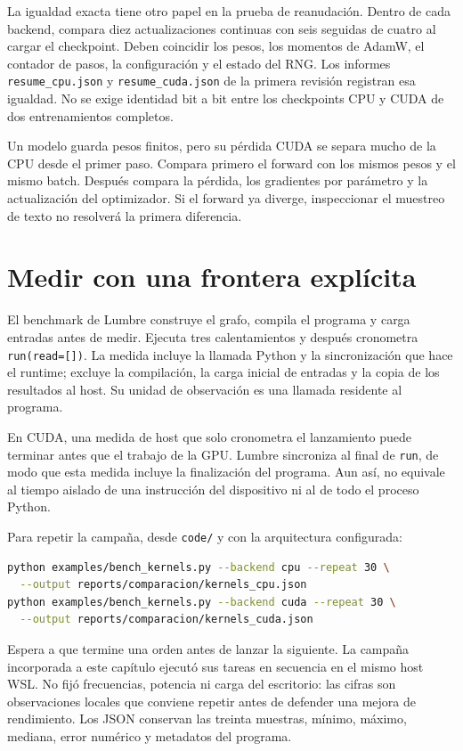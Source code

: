 \documentclass[12pt,a4paper,oneside]{report}
\begin{document}
La igualdad exacta tiene otro papel en la prueba de reanudación. Dentro de cada backend, compara diez actualizaciones continuas con seis seguidas de cuatro al cargar el checkpoint. Deben coincidir los pesos, los momentos de AdamW, el contador de pasos, la configuración y el estado del RNG. Los informes \texttt{resume\_cpu.json} y \texttt{resume\_cuda.json} de la primera revisión registran esa igualdad. No se exige identidad bit a bit entre los checkpoints CPU y CUDA de dos entrenamientos completos.

\begin{practica}
Un modelo guarda pesos finitos, pero su pérdida CUDA se separa mucho de la CPU desde el primer paso. Compara primero el forward con los mismos pesos y el mismo batch. Después compara la pérdida, los gradientes por parámetro y la actualización del optimizador. Si el forward ya diverge, inspeccionar el muestreo de texto no resolverá la primera diferencia.

\end{practica}
\section{Medir con una frontera explícita}
El benchmark de Lumbre construye el grafo, compila el programa y carga entradas antes de medir. Ejecuta tres calentamientos y después cronometra \texttt{run(read=[])}. La medida incluye la llamada Python y la sincronización que hace el runtime; excluye la compilación, la carga inicial de entradas y la copia de los resultados al host. Su unidad de observación es una llamada residente al programa.

En CUDA, una medida de host que solo cronometra el lanzamiento puede terminar antes que el trabajo de la GPU. Lumbre sincroniza al final de \texttt{run}, de modo que esta medida incluye la finalización del programa. Aun así, no equivale al tiempo aislado de una instrucción del dispositivo ni al de todo el proceso Python.

Para repetir la campaña, desde \texttt{code/} y con la arquitectura configurada:

\begin{lstlisting}[language=bash]
python examples/bench_kernels.py --backend cpu --repeat 30 \
  --output reports/comparacion/kernels_cpu.json
python examples/bench_kernels.py --backend cuda --repeat 30 \
  --output reports/comparacion/kernels_cuda.json
\end{lstlisting}
Espera a que termine una orden antes de lanzar la siguiente. La campaña incorporada a este capítulo ejecutó sus tareas en secuencia en el mismo host WSL. No fijó frecuencias, potencia ni carga del escritorio: las cifras son observaciones locales que conviene repetir antes de defender una mejora de rendimiento. Los JSON conservan las treinta muestras, mínimo, máximo, mediana, error numérico y metadatos del programa.
\end{document}
